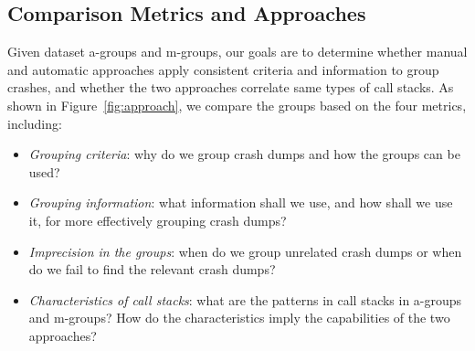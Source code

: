 \begin{table}
\caption{Dataset from 5 Mozilla Applications\label{tab:dataset}}
\end{table}

\subsection{Comparison Metrics and Approaches}
Given dataset a-groups and m-groups, our goals are to determine whether manual and automatic approaches apply consistent criteria and information to group crashes, and whether the two approaches correlate same types of call stacks. As shown in Figure~\ref{fig:approach}, we compare the groups based on the four metrics, including: 
\begin{itemize}
\item {\it Grouping criteria}: why do we group crash dumps and how the groups can be used?
\item {\it Grouping information}: what information shall we use, and how shall we use it, for more effectively grouping crash dumps?
\item {\it Imprecision in the groups}: when do we group unrelated crash dumps or when do we fail to find the relevant crash dumps? 
\item {\it Characteristics of call stacks}: what are the patterns in call stacks in a-groups and m-groups? How do the characteristics imply the capabilities of the two approaches?
\end{itemize}


